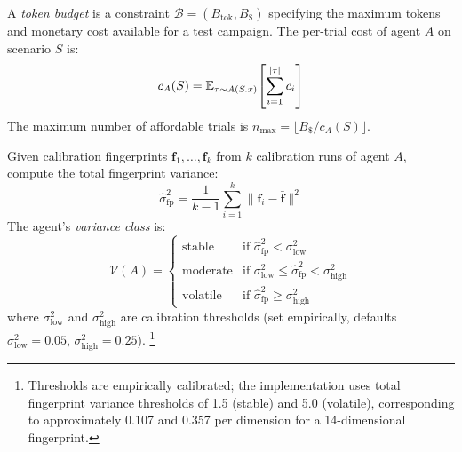 \begin{definition}
\label{def:token-budget}
A \emph{token budget} is a constraint $\mathcal{B} = (B_{\mathrm{tok}},
B_{\$})$ specifying the maximum tokens and monetary cost available for a
test campaign. The per-trial cost of agent $A$ on scenario $S$ is:
\begin{equation}
\label{eq:trial-cost}
  c_A(S) = \mathbb{E}_{\tau \sim A(S.x)}\!\left[\sum_{i=1}^{|\tau|} c_i\right]
\end{equation}
The maximum number of affordable trials is
$n_{\max} = \lfloor B_{\$} / c_A(S) \rfloor$.
\end{definition}

\begin{definition}
\label{def:variance-class}
Given calibration fingerprints $\mathbf{f}_1, \ldots, \mathbf{f}_k$
from $k$ calibration runs of agent $A$, compute the total fingerprint
variance:
\begin{equation}
\label{eq:fp-variance}
  \hat{\sigma}^2_{\mathrm{fp}} =
    \frac{1}{k-1} \sum_{i=1}^{k}
    \|\mathbf{f}_i - \bar{\mathbf{f}}\|^2
\end{equation}
The agent's \emph{variance class} is:
\begin{equation}
\label{eq:variance-class}
  \mathcal{V}(A) =
  \begin{cases}
    \text{stable} & \text{if } \hat{\sigma}^2_{\mathrm{fp}}
      < \sigma^2_{\text{low}} \\
    \text{moderate} & \text{if } \sigma^2_{\text{low}} \leq
      \hat{\sigma}^2_{\mathrm{fp}} < \sigma^2_{\text{high}} \\
    \text{volatile} & \text{if } \hat{\sigma}^2_{\mathrm{fp}}
      \geq \sigma^2_{\text{high}}
  \end{cases}
\end{equation}
where $\sigma^2_{\text{low}}$ and $\sigma^2_{\text{high}}$ are
calibration thresholds (set empirically, defaults
$\sigma^2_{\text{low}} = 0.05$, $\sigma^2_{\text{high}} = 0.25$).%
\footnote{Thresholds are empirically calibrated; the implementation
uses total fingerprint variance thresholds of 1.5 (stable) and 5.0
(volatile), corresponding to approximately 0.107 and 0.357 per
dimension for a 14-dimensional fingerprint.}
\end{definition}

